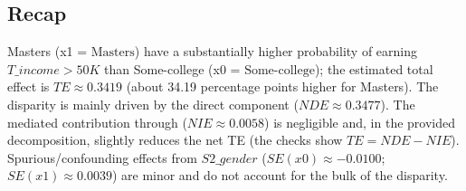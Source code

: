 \documentclass{article}
\begin{document}
\subsection*{Recap}
Masters (x1 = $\text{Masters}$) have a substantially higher probability of earning $T\_income > 50K$ than Some-college (x0 = $\text{Some-college}$); the estimated total effect is $TE \approx 0.3419$ (about 34.19 percentage points higher for Masters). The disparity is mainly driven by the direct component ($NDE \approx 0.3477$). The mediated contribution through  ($NIE \approx 0.0058$) is negligible and, in the provided decomposition, slightly reduces the net TE (the checks show $TE = NDE - NIE$). Spurious/confounding effects from $S2\_gender$ ($SE(x0) \approx -0.0100$; $SE(x1) \approx 0.0039$) are minor and do not account for the bulk of the disparity.
\end{document}
